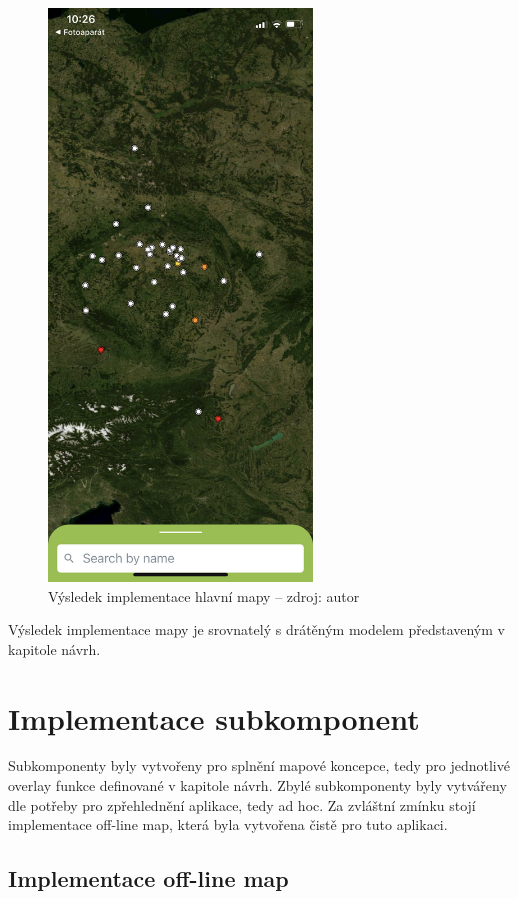 \begin{figure}[H]
	\begin{center}
		\includegraphics[width=70mm]{img/example_map.jpg}
	\end{center}
	\caption[Výsledek implementace hlavní mapy]{Výsledek implementace hlavní mapy -- zdroj: autor}
\end{figure}

Výsledek implementace mapy je srovnatelý s drátěným modelem představeným v kapitole návrh.

\section{Implementace subkomponent}

Subkomponenty byly vytvořeny pro splnění mapové koncepce, tedy pro jednotlivé overlay funkce definované v kapitole návrh. Zbylé subkomponenty byly vytvářeny dle potřeby pro zpřehlednění aplikace, tedy ad hoc. Za zvláštní zmínku stojí implementace off-line map, která byla vytvořena čistě pro tuto aplikaci.

\subsection{Implementace off-line map}

